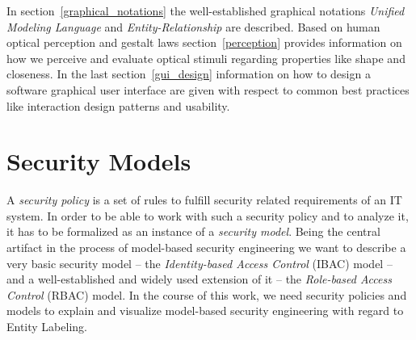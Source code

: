 \documentclass[twoside, openright, 12pt]{book}
\begin{document}
In section~\ref{graphical_notations} the well-established graphical notations \textit{Unified Modeling Language} and \textit{Entity-Relationship} are described.
Based on human optical perception and gestalt laws section~\ref{perception} provides information on how we perceive and evaluate optical stimuli regarding properties like shape and closeness.
In the last section~\ref{gui_design} information on how to design a software graphical user interface are given with respect to common best practices like interaction design patterns and usability.

\section{Security Models}
\label{security_models}
A \textit{security policy} is a set of rules to fulfill security related requirements of an IT system.
In order to be able to work with such a security policy and to analyze it, it has to be formalized as an instance of a \textit{security model}.
Being the central artifact in the process of model-based security engineering we want to describe a very basic security model -- the \textit{Identity-based Access Control} (IBAC) model -- and a well-established and widely used extension of it -- the \textit{Role-based Access Control} (RBAC) model.
In the course of this work, we need security policies and models to explain and visualize model-based security engineering with regard to Entity Labeling.


\end{document}
